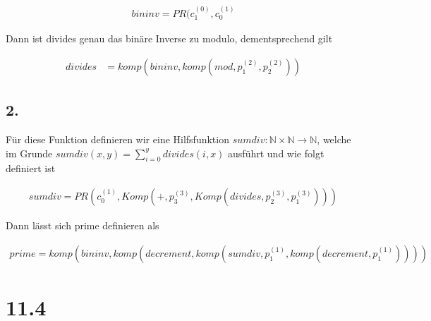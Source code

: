 \documentclass[12pt, a4paper]{article}
\begin{document}
\begin{align*}
bininv = PR(c_1^{(0)}, c_0^{(1)}
\end{align*}

Dann ist divides genau das binäre Inverse zu modulo, dementsprechend gilt

\begin{align*}
divides &= komp(bininv, komp(mod, p_1^{(2)}, p_2^{(2)}))
\end{align*}

\subsection*{2.}
Für diese Funktion definieren wir eine Hilfsfunktion $sumdiv: \mathbb{N} \times \mathbb{N} \rightarrow \mathbb{N}$, welche im Grunde $sumdiv(x,y) = \sum_{i = 0}^y divides(i,x)$ ausführt und wie folgt definiert ist

\begin{align*}
sumdiv = PR(c_0^{(1)}, Komp(+, p_3^{(3)}, Komp(divides, p_2^{(3)}, p_1^{(3)})))
\end{align*}

Dann lässt sich prime definieren als

\begin{align*}
prime = komp(bininv, komp(decrement, komp(sumdiv, p_1^{(1)}, komp(decrement, p_1^{(1)}))))
\end{align*}

\section*{11.4}
\end{document}
